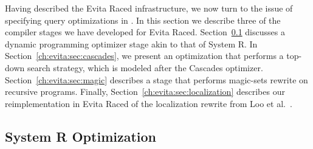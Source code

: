 
Having described the Evita Raced infrastructure, we now turn to the issue of
specifying query optimizations in \OVERLOG.  In this section we describe three
of the compiler stages we have developed for Evita Raced.
Section~\ref{ch:evita:sec:systemr} discusses a dynamic programming optimizer
stage akin to that of System R.  In Section~\ref{ch:evita:sec:cascades}, we
present an optimization that performs a top-down search strategy, which is
modeled after the Cascades optimizer.  Section~\ref{ch:evita:sec:magic}
describes a stage that performs magic-sets rewrite on recursive \OVERLOG
programs.  Finally, Section~\ref{ch:evita:sec:localization} describes our
reimplementation in Evita Raced of the localization rewrite from Loo et
al.~\cite{loo-sigmod06}.

\subsection{System R Optimization}
\label{ch:evita:sec:systemr}

